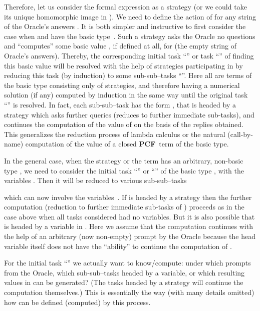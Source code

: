 \documentclass[fleqn]{LMCS}
\theoremstyle{plain}\newtheorem{satz}[thm]{Satz}
\theoremstyle{plain}\newtheorem{hyp}[thm]{Hypothesis}
\theoremstyle{plain}\newtheorem{hyps}[thm]{Hypotheses}
\theoremstyle{definition}\newtheorem{note}[thm]{Note}
\newcommand{\PCF}{\mbox{\bf PCF}}
\newcommand{\?}{\mbox{?}}
\begin{document}
Therefore, let us consider the formal expression  as a strategy 
(or we could take its unique homomorphic image in ). 
We need to define the action of  
for any string of the Oracle's answers . 
It is both simpler and instructive to first consider the case when  and  
have the basic type~. Such a strategy asks the Oracle no questions  
and ``computes'' some basic value , 
if defined at all, for  (the empty string of Oracle's answers). 
Thereby, the corresponding initial task ``'' or task 
``'' of finding this basic value  will be resolved 
with the help of strategies participating in  by reducing this task 
(by induction) to some sub-sub--tasks ``''. 
Here all  are terms of the basic type consisting only of strategies, and therefore 
having a numerical solution (if any) computed by induction in the same way 
until the original task ``'' is resolved.
In fact, each  sub-sub--task  has the form 
, that is headed by a strategy  
which asks further queries (reduces  to further immediate sub-tasks),
and continues the computation of the value of  on the basis of the replies obtained. 
This generalizes the 
reduction process of lambda calculus or the natural (call-by-name) computation 
of the value of a closed \PCF\ term of the basic type. 


















In the general case, when the strategy  or the term  has 
an arbitrary, non-basic type 
,
we need to consider the initial task ``'' 
or ``'' 
of the basic type , with the variables . 
Then
it will be reduced to various sub-sub--tasks 
 
which can now involve the variables~. If  
is headed by a strategy 
 then the further computation (reduction to further immediate sub-tasks of ) 
proceeds as in the case above when all tasks considered had no variables. 
But it is also possible that 
 is headed by a variable  in . 
Here we assume that the computation continues with 
the help of an arbitrary (now non-empty) prompt  by the Oracle 
because the head variable  itself 
does not have the ``ability'' to continue the computation of . 

For the initial task ``'' 
we actually want to know/compute: under which prompts  from the Oracle, which 
sub-sub--tasks  headed by a variable, 
or which resulting values in  can be generated? 
(The tasks  headed by a strategy will continue the computation themselves.)
This is essentially the way (with many details omitted) 
how  can be defined (computed) 
by this process.
\end{document}
